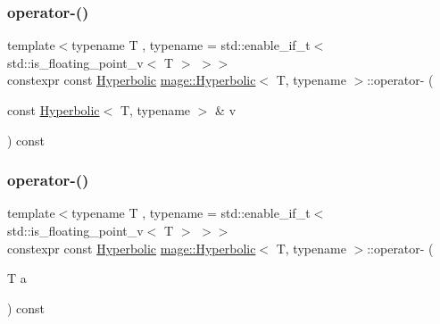 \subsubsection{\texorpdfstring{operator-\/()}{operator-()}\hspace{0.1cm}{\footnotesize\ttfamily [2/3]}}
{\footnotesize\ttfamily template$<$typename T , typename  = std\+::enable\+\_\+if\+\_\+t$<$ std\+::is\+\_\+floating\+\_\+point\+\_\+v$<$ T $>$ $>$$>$ \\
constexpr const \mbox{\hyperlink{structmage_1_1_hyperbolic}{Hyperbolic}} \mbox{\hyperlink{structmage_1_1_hyperbolic}{mage\+::\+Hyperbolic}}$<$ T, typename $>$\+::operator-\/ (\begin{DoxyParamCaption}\item[{const \mbox{\hyperlink{structmage_1_1_hyperbolic}{Hyperbolic}}$<$ T, typename $>$ \&}]{v }\end{DoxyParamCaption}) const\hspace{0.3cm}{\ttfamily [noexcept]}}

\mbox{\label{structmage_1_1_hyperbolic_a3b5c1c45c2da2583c7889613e47032ad}} 
\subsubsection{\texorpdfstring{operator-\/()}{operator-()}\hspace{0.1cm}{\footnotesize\ttfamily [3/3]}}
{\footnotesize\ttfamily template$<$typename T , typename  = std\+::enable\+\_\+if\+\_\+t$<$ std\+::is\+\_\+floating\+\_\+point\+\_\+v$<$ T $>$ $>$$>$ \\
constexpr const \mbox{\hyperlink{structmage_1_1_hyperbolic}{Hyperbolic}} \mbox{\hyperlink{structmage_1_1_hyperbolic}{mage\+::\+Hyperbolic}}$<$ T, typename $>$\+::operator-\/ (\begin{DoxyParamCaption}\item[{T}]{a }\end{DoxyParamCaption}) const\hspace{0.3cm}{\ttfamily [noexcept]}}

\mbox{\label{structmage_1_1_hyperbolic_a8f5bd1ce6f0d277874b85c432fc5486f}} 
